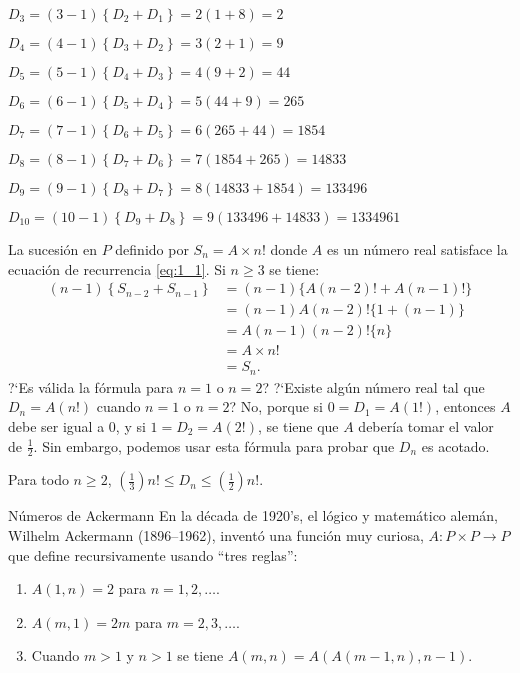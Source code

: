 \begin{example}{}
$D_{3}=\left(3-1\right)\left\{D_{2}+D_{1}\right\}=2\left(1+8\right)=2$

$D_{4}=\left(4 - 1\right)\left\{D_{3}+D_{2}\right\}=3\left(2+1\right)=9$

$D_{5}=\left(5-1\right)\left\{D_{4}+D_{3}\right\}=4\left(9+2\right)=44$

$D_{6}=(6-1)\left\{D_{5}+D_{4}\right\}=5\left(44 + 9\right)=265$

$D_{7}=\left(7-1\right)\left\{D_{6}+D_{5}\right\}=6\left(265+44\right)=1854$

$D_{8}=\left(8-1\right)\left\{D_{7}+D_{6}\right\}=7\left(1854+265\right)=14833$

$D_{9}=\left(9-1\right)\left\{D_{8}+D_{7}\right\}=8\left(14833+1854\right)=133496$

$D_{10}=\left(10-1\right)\left\{D_{9}+D_{8}\right\}=9\left(133496+14833\right)=1334961$

La sucesión en $P$ definido por $S_{n}=A\times n!$ donde $A$ es un número real satisface la ecuación de recurrencia \eqref{eq:1_1}. Si $n\geq3$ se tiene:
\begin{align*}
	\left(n-1\right)\left\{S_{n-2}+S_{n-1}\right\}
	&=(n-1)\{A(n-2)!+A(n-1)!\} \\
	&=(n-1)A(n-2)!\{1+(n-1)\} \\
	&=A(n-1)(n-2)!\{n\}\\
	&=A\times n!\\
	&=S_{n}.
\end{align*}
?`Es válida la fórmula para $n=1$ o $n=2$? ?`Existe algún número real tal que $D_{n}=A(n!)$ cuando $n=1$ o $n=2$? No, porque si $0=D_{1}=A(1!)$, entonces $A$ debe ser igual a $0$, y si $1=D_{2}=A(2!)$, se tiene que $A$ debería tomar el valor de $\frac{1}{2}$. Sin embargo, podemos usar esta fórmula para probar que $D_{n}$ es acotado.
\end{example}

\begin{theorem}{}
Para todo $n\geq 2$, $\left(\frac{1}{3}\right)n!\leq D_{n}\leq\left(\frac{1}{2}\right)n!$.
\end{theorem}

\begin{example}{Números de Ackermann}
	En la década de 1920's, el lógico y matemático alemán, Wilhelm Ackermann (1896–1962), inventó una función muy curiosa, $A\colon P\times P\rightarrow P$ que define recursivamente usando ``tres reglas'':
	\begin{enumerate}[Regla 1]
		\item $A(1,n)=2$ para $n=1,2,\ldots$.
		\item $A(m,1)=2m$ para $m=2,3,\ldots$.
		\item Cuando $m>1$ y $n>1$ se tiene $A(m,n)=A(A(m-1,n),n-1)$.
	\end{enumerate}
\end{example}

